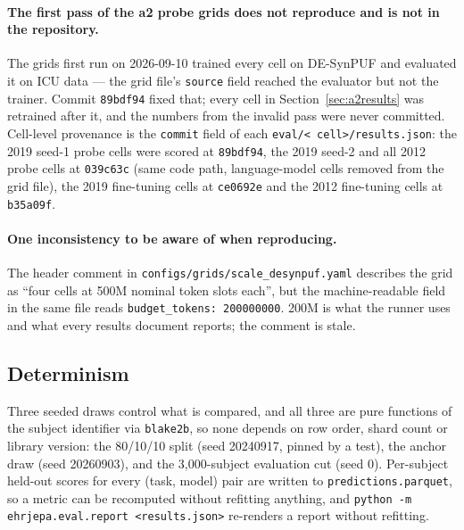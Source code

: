 \documentclass[11pt,a4paper]{article}
\newcommand{\code}[1]{\texttt{\small #1}}
\begin{document}
\paragraph{The first pass of the a2 probe grids does not reproduce and is not
in the repository.} The grids first run on 2026-09-10 trained every cell on
DE-SynPUF and evaluated it on ICU data --- the grid file's \code{source} field
reached the evaluator but not the trainer. Commit \code{89bdf94} fixed that;
every cell in Section~\ref{sec:a2results} was retrained after it, and the
numbers from the invalid pass were never committed. Cell-level provenance is
the \code{commit} field of each \code{eval/\textless
cell\textgreater/results.json}: the 2019 seed-1 probe cells were scored at
\code{89bdf94}, the 2019 seed-2 and all 2012 probe cells at \code{039c63c}
(same code path, language-model cells removed from the grid file), the 2019
fine-tuning cells at \code{ce0692e} and the 2012 fine-tuning cells at
\code{b35a09f}.

\paragraph{One inconsistency to be aware of when reproducing.}
The header comment in \code{configs/grids/}\allowbreak\code{scale\_desynpuf.yaml} describes the
grid as ``four cells at 500M nominal token slots each'', but the
machine-readable field in the same file reads
\code{budget\_tokens:}~\code{200000000}. 200M is what the runner uses and what
every
results document reports; the comment is stale.

\subsection{Determinism}

Three seeded draws control what is compared, and all three are pure functions of
the subject identifier via \code{blake2b}, so none depends on row order, shard
count or library version: the 80/10/10 split (seed 20240917, pinned by a test),
the anchor draw (seed 20260903), and the 3{,}000-subject evaluation cut (seed
0). Per-subject held-out scores for every (task, model) pair are written to
\code{predictions.parquet}, so a metric can be recomputed without refitting
anything, and \code{python -m ehrjepa.eval.report <results.json>} re-renders a
report without refitting.
\end{document}

